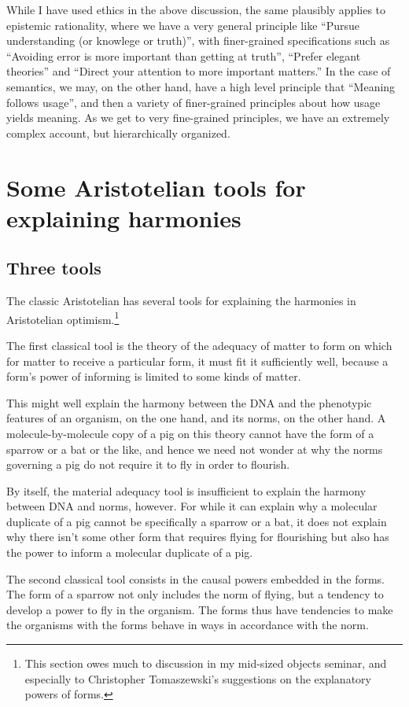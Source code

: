 While I have used ethics in the above discussion, the same plausibly applies to epistemic rationality, where we have a very general
principle like ``Pursue understanding (or knowlege or truth)'', with finer-grained specifications such as ``Avoiding error is more
important than getting at truth'', ``Prefer elegant theories'' and ``Direct your attention to more important matters.'' In the case
of semantics, we may, on the other hand, have a high level principle that ``Meaning follows usage'', and then a variety of finer-grained 
principles about how usage yields meaning. As we get to very fine-grained principles, we have an extremely complex account, but hierarchically
organized.

\section{Some Aristotelian tools for explaining harmonies}
\subsection{Three tools}
The classic Aristotelian has several tools for explaining the harmonies in Aristotelian optimism.\footnote{This section owes much to discussion in my mid-sized objects seminar, and especially to Christopher Tomaszewski's suggestions on the explanatory powers of forms.}

The first classical tool is the theory of the adequacy of matter to form on which for matter to receive a particular 
form, it must fit it sufficiently well, because a form's power of informing is limited to some kinds of matter. 

This might well explain the harmony between the DNA and the phenotypic features of an organism, on the one hand, 
and its norms, on the other hand. A molecule-by-molecule copy of a pig on this theory cannot have the form of a sparrow or 
a bat or the like, and hence we need not wonder at why the norms governing a pig do not require it to fly in order to flourish.

By itself, the material adequacy tool is insufficient to explain the harmony between DNA and norms, however. For while 
it can explain why a molecular duplicate of a pig cannot be specifically a sparrow or a bat, it does not explain why there 
isn't some other form that requires flying for flourishing but also has the power to inform a molecular duplicate of a pig.

The second classical tool consists in the causal powers embedded in the forms. The form of a sparrow not only includes the 
norm of flying, but a tendency to develop a power to fly in the organism. The forms thus have tendencies to make the organisms
with the forms behave in ways in accordance with the norm.

